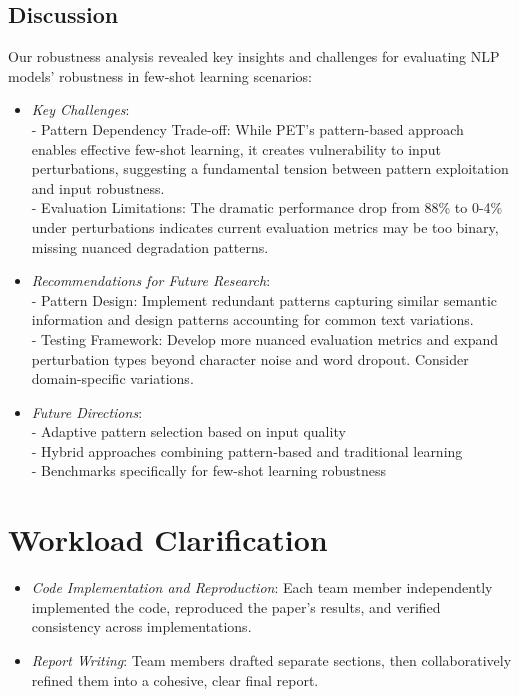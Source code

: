 \documentclass[11pt,a4paper]{article}
\begin{document}
\subsection{Discussion} 
Our robustness analysis revealed key insights and challenges for evaluating NLP models' robustness in few-shot learning scenarios:
\begin{itemize}[topsep=0pt]
  \item \textit{Key Challenges}:\\ 
  - Pattern Dependency Trade-off: While PET's pattern-based approach enables effective few-shot learning, it creates vulnerability to input perturbations, suggesting a fundamental tension between pattern exploitation and input robustness.\\ 
  - Evaluation Limitations: The dramatic performance drop from 88\% to 0-4\% under perturbations indicates current evaluation metrics may be too binary, missing nuanced degradation patterns.
  \item \textit{Recommendations for Future Research}:\\ 
  - Pattern Design: Implement redundant patterns capturing similar semantic information and design patterns accounting for common text variations.\\
  - Testing Framework: Develop more nuanced evaluation metrics and expand perturbation types beyond character noise and word dropout. Consider domain-specific variations.
  \item \textit{Future Directions}:\\ 
  - Adaptive pattern selection based on input quality\\
  - Hybrid approaches combining pattern-based and traditional learning\\
  - Benchmarks specifically for few-shot learning robustness
\end{itemize}

\section{Workload Clarification}
\begin{itemize}
  \item \textit{Code Implementation and Reproduction}: Each team member independently implemented the code, reproduced the paper’s results, and verified consistency across implementations.  
  \item \textit{Report Writing}: Team members drafted separate sections, then collaboratively refined them into a cohesive, clear final report.  
\end{itemize}
\end{document}
